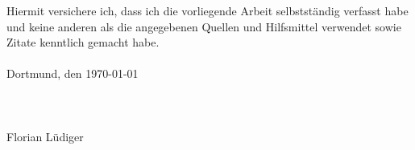 \cleardoublepage
\normalsize
Hiermit versichere ich, dass ich die vorliegende Arbeit selbstständig verfasst habe und keine anderen als die angegebenen Quellen und Hilfsmittel verwendet sowie Zitate kenntlich gemacht habe.\\\\
Dortmund, den \today \\\\\\\\
Florian Lüdiger